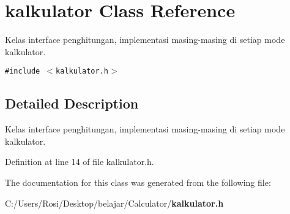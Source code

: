 \section{kalkulator Class Reference}
\label{classkalkulator}
Kelas interface penghitungan, implementasi masing-masing di setiap mode kalkulator.  


{\tt \#include $<$kalkulator.h$>$}



\subsection{Detailed Description}
Kelas interface penghitungan, implementasi masing-masing di setiap mode kalkulator. 



Definition at line 14 of file kalkulator.h.

The documentation for this class was generated from the following file:\begin{CompactItemize}
\item 
C:/Users/Rosi/Desktop/belajar/Calculator/{\bf kalkulator.h}\end{CompactItemize}
